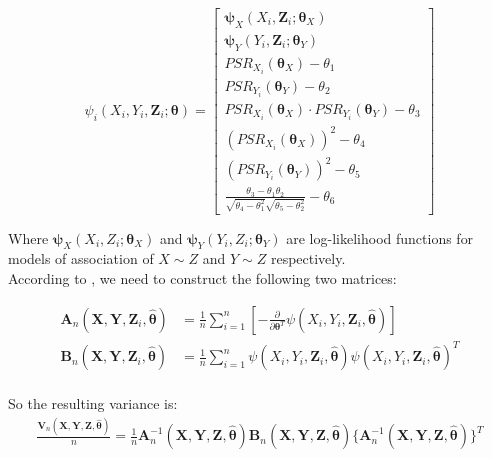 \documentclass[]{article}
\begin{document}
\[
\psi_i(X_i, Y_i, \pmb{Z}_i; \pmb{\theta}) = \begin{bmatrix}
    \pmb{\psi}_X(X_i,\pmb{Z}_i; \pmb{\theta}_X) \\
    \pmb{\psi}_Y(Y_i,\pmb{Z}_i; \pmb{\theta}_Y) \\
    PSR_{X_{i}}(\pmb{\theta}_X) -\theta_1 \\
    PSR_{Y_{i}}(\pmb{\theta}_Y) -\theta_2 \\
    PSR_{X_{i}}(\pmb{\theta}_X) \cdot PSR_{Y_i}(\pmb{\theta}_Y) -\theta_3 \\
    (PSR_{X_{i}}(\pmb{\theta}_X))^2 -\theta_4 \\
    (PSR_{Y_{i}}(\pmb{\theta}_Y))^2 -\theta_5 \\
    \frac{\theta_3 - \theta_1\theta_2}{\sqrt{\theta_4 - \theta_1^2}\sqrt{\theta_5 - \theta_2^2}} - \theta_6
\end{bmatrix}
\]

Where $\pmb{\psi}_X(X_i,Z_i; \pmb{\theta}_X)$ and $\pmb{\psi}_Y(Y_i,Z_i; \pmb{\theta}_Y)$ are log-likelihood functions for models of association of $X\sim Z $ and $Y \sim Z$ respectively.\\
According to \cite{stefanski2002calculus}, we need to construct the following two matrices:

	
	$$
	\begin{aligned}
		\pmb{A}_n(\pmb{X}, \pmb{Y}, \pmb{Z}_i, \hat{\pmb{\theta}}) &= \frac{1}{n} \sum_{i = 1}^{n}\left[ -\frac{\partial}{\partial \pmb{\theta}^T}\psi(X_i, Y_i, \pmb{Z}_i, \hat{\pmb{\theta}}) \right]\\
		\pmb{B}_n(\pmb{X}, \pmb{Y}, \pmb{Z}_i, \hat{\pmb{\theta}}) &= \frac{1}{n} \sum_{i = 1}^{n} \psi(X_i, Y_i, \pmb{Z}_i, \hat{\pmb{\theta}}) \psi(X_i, Y_i, \pmb{Z}_i, \hat{\pmb{\theta}})^T\\
 	\end{aligned}
	$$

So the resulting variance is:
	$$
	\begin{aligned}
		\frac{\pmb{V}_n(\pmb{X}, \pmb{Y}, \pmb{Z}, \hat{\pmb{\theta}})}{n} = \frac{1}{n}\pmb{A}_n^{-1}(\pmb{X}, \pmb{Y}, \pmb{Z}, \hat{\pmb{\theta}}) \pmb{B}_n(\pmb{X}, \pmb{Y}, \pmb{Z}, \hat{\pmb{\theta}})  \{\pmb{A}_n^{-1}(\pmb{X}, \pmb{Y}, \pmb{Z}, \hat{\pmb{\theta}}) \}^T
 	\end{aligned}
	$$
  
\end{document}

